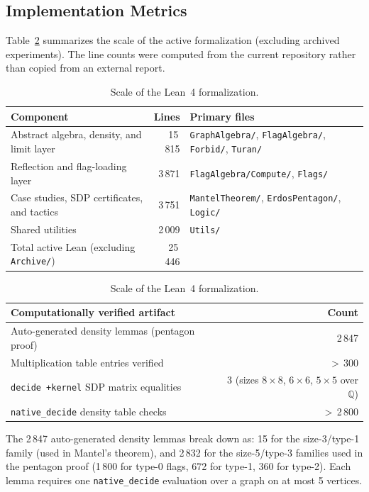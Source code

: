 \documentclass{article}
\newcommand{\lean}[1]{\texttt{#1}}
\begin{document}
\subsection{Implementation Metrics}

Table~\ref{tab:metrics} summarizes the scale of the active formalization
(excluding archived experiments).  The line counts were computed from the
current repository rather than copied from an external report.

\begin{table}
  \caption{Scale of the Lean~4 formalization.}
  \label{tab:metrics}
  \begin{tabular}{lrl}
    \toprule
    Component & Lines & Primary files \\
    \midrule
    Abstract algebra, density, and limit layer & 15\,815 &
      \lean{GraphAlgebra/}, \lean{FlagAlgebra/}, \lean{Forbid/}, \lean{Turan/} \\
    Reflection and flag-loading layer & 3\,871 &
      \lean{FlagAlgebra/Compute/}, \lean{Flags/} \\
    Case studies, SDP certificates, and tactics & 3\,751 &
      \lean{MantelTheorem/}, \lean{ErdosPentagon/}, \lean{Logic/} \\
    Shared utilities & 2\,009 &
      \lean{Utils/} \\
    \midrule
    Total active Lean (excluding \lean{Archive/}) & 25\,446 & \\
    \bottomrule
  \end{tabular}

  \medskip
  \begin{tabular}{lr}
    \toprule
    Computationally verified artifact & Count \\
    \midrule
    Auto-generated density lemmas (pentagon proof) & 2\,847 \\
    Multiplication table entries verified & $>$\,300 \\
    \lean{decide~+kernel} SDP matrix equalities & 3 (sizes $8{\times}8$, $6{\times}6$, $5{\times}5$ over $\mathbb{Q}$) \\
    \lean{native\_decide} density table checks & $>$\,2\,800 \\
    \bottomrule
  \end{tabular}
\end{table}

The 2\,847 auto-generated density lemmas break down as: 15 for the
size-3/type-1 family (used in Mantel's theorem), and 2\,832 for the
size-5/type-3 families used in the pentagon proof (1\,800 for type-0 flags,
672 for type-1, 360 for type-2).  Each lemma requires one \lean{native\_decide}
evaluation over a graph on at most 5 vertices.
\end{document}
